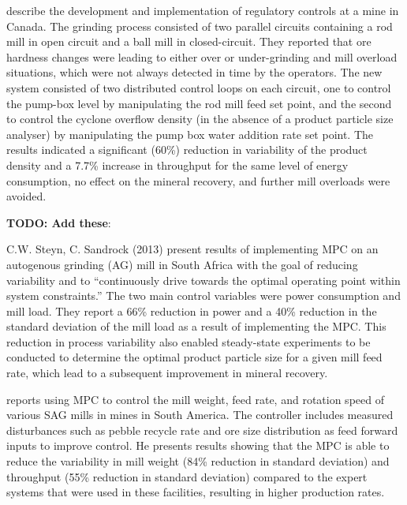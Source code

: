 \cite{nunez_self-optimizing_2009} describe the development and implementation of regulatory controls at a mine in Canada. The grinding process consisted of two parallel circuits containing a rod mill in open circuit and a ball mill in closed-circuit. They reported that ore hardness changes were leading to either over or under-grinding and mill overload situations, which were not always detected in time by the operators. The new system consisted of two distributed control loops on each circuit, one to control the pump-box level by manipulating the rod mill feed set point, and the second to control the cyclone overflow density (in the absence of a product particle size analyser) by manipulating the pump box water addition rate set point. The results indicated a significant (60\%) reduction in variability of the product density and a 7.7\% increase in throughput for the same level of energy consumption, no effect on the mineral recovery, and further mill overloads were avoided.

\textbf{TODO: Add these}:
\begin{outline}
	\1 \cite{yutronic_sag_2011}
	\1 \cite{nunez_tecks_2019}
\end{outline}

C.W. Steyn, C. Sandrock (2013) present results of implementing MPC on an autogenous grinding (AG) mill in South Africa with the goal of reducing variability and to ``continuously drive towards the optimal operating point within system constraints.'' The two main control variables were power consumption and mill load. They report a 66\% reduction in power and a 40\% reduction in the standard deviation of the mill load as a result of implementing the MPC. This reduction in process variability also enabled steady-state experiments to be conducted to determine the optimal product particle size for a given mill feed rate, which lead to a subsequent improvement in mineral recovery.

\cite{gough_sag_2015} reports using MPC to control the mill weight, feed rate, and rotation speed of various SAG mills in mines in South America. The controller includes measured disturbances such as pebble recycle rate and ore size distribution as feed forward inputs to improve control. He presents results showing that the MPC is able to reduce the variability in mill weight (84\% reduction in standard deviation) and throughput (55\% reduction in standard deviation) compared to the expert systems that were used in these facilities, resulting in higher production rates.

